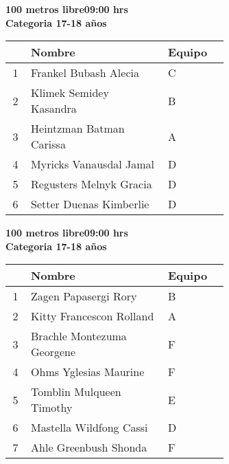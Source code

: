 \begin{minipage}{0.95\linewidth}\vspace{0.5cm} 
\begin{flushleft}
\textbf{
\hspace{-0.15cm}100 metros libre\hspace{1.5cm}09:00 hrs \\Categoria 17-18 años}\vspace{-0.2cm} 
\end{flushleft}
\begin{tabular}{cp{0.63\linewidth}l}
\hline
& \textbf{Nombre} & \textbf{Equipo} \\ \hline
1 & Frankel Bubash Alecia & C \\ 
2 & Klimek Semidey Kasandra & B \\ 
3 & Heintzman Batman Carissa & A \\ 
4 & Myricks Vanausdal Jamal & D \\ 
5 & Regusters Melnyk Gracia & D \\ 
6 & Setter Duenas Kimberlie & D \\ 
\end{tabular}
\end{minipage}
\begin{minipage}{0.95\linewidth}\vspace{0.5cm} 
\begin{flushleft}
\textbf{
\hspace{-0.15cm}100 metros libre\hspace{1.5cm}09:00 hrs \\Categoria 17-18 años}\vspace{-0.2cm} 
\end{flushleft}
\begin{tabular}{cp{0.63\linewidth}l}
\hline
& \textbf{Nombre} & \textbf{Equipo} \\ \hline
1 & Zagen Papasergi Rory & B \\ 
2 & Kitty Francescon Rolland & A \\ 
3 & Brachle Montezuma Georgene & F \\ 
4 & Ohms Yglesias Maurine & F \\ 
5 & Tomblin Mulqueen Timothy & E \\ 
6 & Mastella Wildfong Cassi & D \\ 
7 & Ahle Greenbush Shonda & F \\ 
\end{tabular}
\end{minipage}
